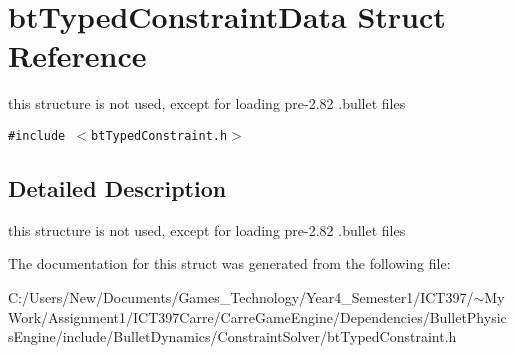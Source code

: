 \hypertarget{structbt_typed_constraint_data}{
\section{btTypedConstraintData Struct Reference}
\label{structbt_typed_constraint_data}
}
this structure is not used, except for loading pre-2.82 .bullet files  


{\tt \#include $<$btTypedConstraint.h$>$}



\subsection{Detailed Description}
this structure is not used, except for loading pre-2.82 .bullet files 

The documentation for this struct was generated from the following file:\begin{CompactItemize}
\item 
C:/Users/New/Documents/Games\_\-Technology/Year4\_\-Semester1/ICT397/$\sim$My Work/Assignment1/ICT397Carre/CarreGameEngine/Dependencies/BulletPhysicsEngine/include/BulletDynamics/ConstraintSolver/btTypedConstraint.h\end{CompactItemize}
